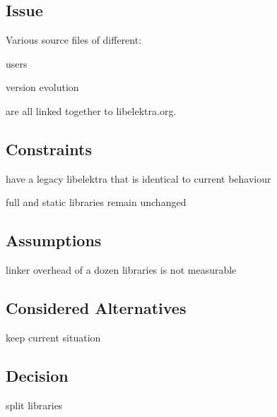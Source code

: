\subsection*{Issue}

Various source files of different\+:


\begin{DoxyItemize}
\item users
\item version evolution
\end{DoxyItemize}

are all linked together to libelektra.\+org.

\subsection*{Constraints}


\begin{DoxyItemize}
\item have a legacy libelektra that is identical to current behaviour
\item full and static libraries remain unchanged
\end{DoxyItemize}

\subsection*{Assumptions}


\begin{DoxyItemize}
\item linker overhead of a dozen libraries is not measurable
\end{DoxyItemize}

\subsection*{Considered Alternatives}


\begin{DoxyItemize}
\item keep current situation
\end{DoxyItemize}

\subsection*{Decision}


\begin{DoxyItemize}
\item split libraries
\end{DoxyItemize}

